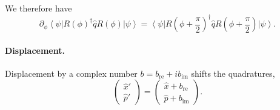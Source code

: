 \documentclass[aps,pra,10pt,twocolumn,groupedaddress,nofootinbib]{revtex4-1}
\theoremstyle{plain}
\newcommand{\ket}[1]{\ensuremath{\left| #1 \right \rangle}}
\newcommand{\bra}[1]{\ensuremath{\left \langle #1 \right |}}
\newcommand{\x}{\hat{x}}
\newcommand{\p}{\hat{p}}
\begin{document}
We therefore have
\[\partial_{\phi}\bra{\psi} R(\phi)^{\dagger} \hat{q} R(\phi) \ket{\psi} =  \bra{\psi} R(\phi + \frac{\pi}{2})^{\dagger} \hat{q} R(\phi + \frac{\pi}{2}) \ket{\psi}. \]

\paragraph{Displacement.}

Displacement by a complex number $b = b_{\mathrm{re}} + i b_{\mathrm{im}}$ shifts the quadratures,
\[
\begin{pmatrix}
\x'\\
\p'
\end{pmatrix} = \begin{pmatrix} \x + b_{\mathrm{re}} \\ \p + b_{\mathrm{im}} \end{pmatrix}. \]
\end{document}

